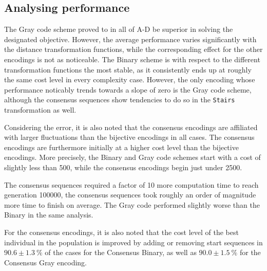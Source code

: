 \documentclass[a4paper,12pt]{article}
\theoremstyle{plain}
\theoremstyle{definition}
\begin{document}
   \subsection{Analysing performance} 
   The Gray code scheme proved to in all of
   A-D be 
   superior in solving the designated objective. However, the average performance 
   varies significantly with the distance transformation
   functions, while the corresponding effect for the other encodings is not as
   noticeable. The Binary scheme is with respect to
   the different transformation functions the most stable, as it consistently
   ends up at roughly the same cost level in
   every complexity case. However, the only encoding whose performance noticably
   trends towards a slope of zero is the Gray code scheme, although the consensus sequences show
   tendencies to do so in the \texttt{Stairs} transformation as well. 

   Considering the error, it is also noted that the consensus
   encodings are affiliated with larger fluctuations than the
   bijective encodings in all cases. The consensus encodings are furthermore
   initially at a higher cost level than the bijective encodings. More precisely, 
   the Binary and Gray code schemes start with a cost of slightly less than 500, 
   while the consensus encodings begin just under 2500. 

   The consensus sequences required a factor of 10 more computation time  
   to reach generation 100000, the consensus sequences took roughly an order of 
   magnitude more time to finish on average.
   The Gray code performed slightly worse than the Binary in the same analysis.

   For the consensus encodings, it is also noted that the cost level of the best
   individual in the population is improved by adding or removing start
   sequences in $90.6 \pm 1.3~\%$ of the cases for the Consensus Binary, as well as
   $90.0 \pm 1.5~\%$ for the Consensus Gray encoding.
\end{document}
